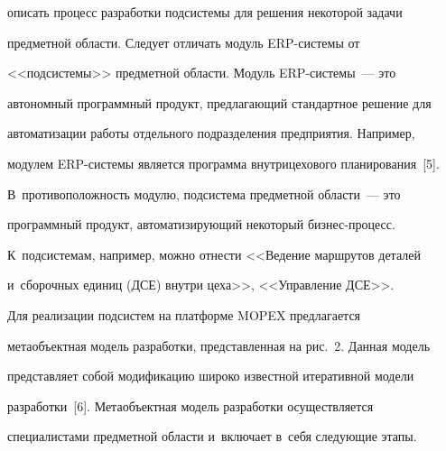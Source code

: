 описать процесс разработки подсистемы для решения некоторой задачи 

предметной области. Следует отличать модуль ERP-системы от 

<<подсистемы>> предметной области. Модуль ERP-сис\-те\-мы~--- это 

автономный программный продукт, предлагающий стандартное решение для 

автоматизации работы отдельного подразделения предприятия. Например, 

модулем ERP-системы является программа внутрицехового планирования~[5]. 

В~противоположность модулю, подсистема предметной области~--- это 

программный продукт, автоматизирующий некоторый биз\-нес-про\-цесс. 

К~подсистемам, например, можно отнести <<Ведение маршрутов деталей 

и~сборочных единиц (ДСЕ) внутри цеха>>, <<Управление ДСЕ>>.

  

  Для реализации подсистем на платформе MOPEX предлагается 

метаобъектная модель разработки, представленная на рис.~2. Данная модель 

представляет собой модификацию широко известной итеративной модели 

разработки~[6]. Метаобъектная модель разработки осуществляется 

специалистами предметной области и~включает в~себя следующие этапы. 

